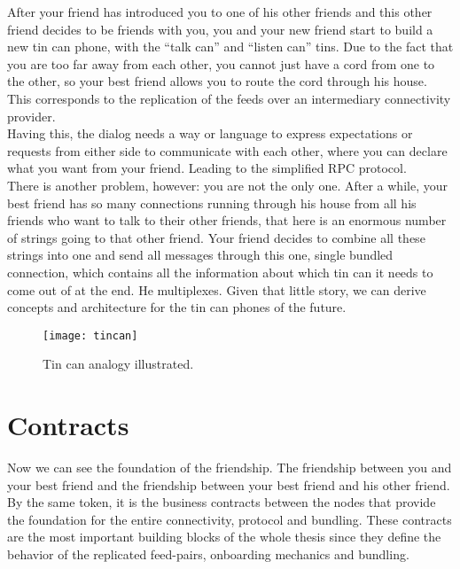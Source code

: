 After your friend has introduced you to one of his other friends and this other friend decides to be friends with you, you and your new friend start to build a new tin can phone, with the “talk can” and “listen can” tins. Due to the fact that you are too far away from each other, you cannot just have a cord from one to the other, so your best friend allows you to route the cord through his house. This corresponds to the replication of the feeds over an intermediary connectivity provider.
\\

Having this, the dialog needs a way or language to express expectations or requests from either side to communicate with each other, where you can declare what you want from your friend. Leading to the simplified RPC protocol.\\ 

There is another problem, however: you are not the only one. After a while, your best friend has so many connections running through his house from all his friends who want to talk to their other friends, that here is an enormous number of strings going to that other friend. Your friend decides to combine all these strings into one and send all messages through this one, single bundled connection, which contains all the information about which tin can it needs to come out of at the end. He multiplexes. Given that little story, we can derive concepts and architecture for the tin can phones of the future.

\begin{figure}
    \centering
    \texttt{[image: tincan]}
    \caption{Tin can analogy illustrated.}
    \label{fig:tincan}
\end{figure}

\section{Contracts}
Now we can see the foundation of the friendship. The friendship between you and your best friend and the friendship between your best friend and his other friend. By the same token, it is the business contracts between the nodes that provide the foundation for the entire connectivity, protocol and bundling. These contracts are the most important building blocks of the whole thesis since they define the behavior of the replicated feed-pairs, onboarding mechanics and bundling.

